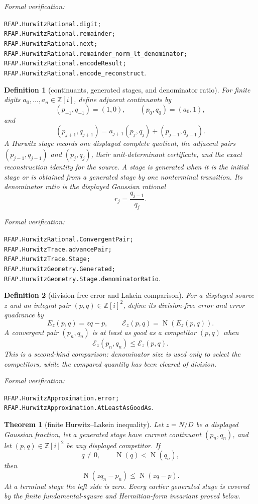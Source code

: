 \documentclass[11pt]{article}
\newtheorem{theorem}{Theorem}[section]
\newtheorem{definition}[definition]{Definition}
\newcommand{\Zi}{\mathbb{Z}[i]}
\newcommand{\Norm}[1]{\operatorname{N}\!\left(#1\right)}
\newcommand{\leanref}[1]{\par\smallskip\noindent
  \emph{Formal verification:}\par\nobreak
  {\raggedright\nolinkurl{#1}.\par}}
\begin{document}
\leanref{RFAP.HurwitzRational.digit;
RFAP.HurwitzRational.remainder;
RFAP.HurwitzRational.next;
RFAP.HurwitzRational.remainder_norm_lt_denominator;
RFAP.HurwitzRational.encodeResult;
RFAP.HurwitzRational.encode_reconstruct}

\begin{definition}[continuants, generated stages, and denominator ratio]
\label{def:hurwitz-stage}
For finite digits $a_0,\ldots,a_n\in\Zi$, define adjacent continuants by
\[
 (p_{-1},q_{-1})=(1,0),\qquad (p_0,q_0)=(a_0,1),
\]
and
\begin{equation}
\label{eq:continuant-recurrence}
 (p_{j+1},q_{j+1})=
 a_{j+1}(p_j,q_j)+(p_{j-1},q_{j-1}).
\end{equation}
A \emph{Hurwitz stage} records one displayed complete quotient, the adjacent
pairs $(p_{j-1},q_{j-1})$ and $(p_j,q_j)$, their unit-determinant
certificate, and the exact reconstruction identity for the source.  A stage
is \emph{generated} when it is the initial stage or is obtained from a
generated stage by one nonterminal transition.  Its \emph{denominator ratio}
is the displayed Gaussian rational
\begin{equation}
\label{eq:denominator-ratio}
                         r_j=\frac{q_{j-1}}{q_j}.
\end{equation}
\end{definition}

\leanref{RFAP.HurwitzRational.ConvergentPair;
RFAP.HurwitzTrace.advancePair;
RFAP.HurwitzTrace.Stage;
RFAP.HurwitzGeometry.Generated;
RFAP.HurwitzGeometry.Stage.denominatorRatio}

\begin{definition}[division-free error and Lakein comparison]
\label{def:lakein-comparison}
For a displayed source $z$ and an integral pair $(p,q)\in\Zi^2$, define its
division-free error and error quadrance by
\[
             E_z(p,q)=zq-p,
             \qquad \mathcal E_z(p,q)=\Norm{E_z(p,q)}.
\]
A convergent pair $(p_n,q_n)$ is \emph{at least as good as} a competitor
$(p,q)$ when
\[
                      \mathcal E_z(p_n,q_n)
                      \le\mathcal E_z(p,q).
\]
This is a second-kind comparison: denominator size is used only to select the
competitors, while the compared quantity has been cleared of division.
\end{definition}

\leanref{RFAP.HurwitzApproximation.error;
RFAP.HurwitzApproximation.AtLeastAsGoodAs}

\begin{theorem}[finite Hurwitz--Lakein inequality]
\label{thm:finite-lakein}
Let $z=N/D$ be a displayed Gaussian fraction, let a generated stage have
current continuant $(p_n,q_n)$, and let $(p,q)\in\Zi^2$ be any displayed
competitor.  If
\[
                         q\ne0,
              \qquad    \Norm q<\Norm{q_n},
\]
then
\begin{equation}
\label{eq:finite-lakein}
                        \Norm{zq_n-p_n}
                     \le\Norm{zq-p}.
\end{equation}
At a terminal stage the left side is zero.  Every earlier generated stage is
covered by the finite fundamental-square and Hermitian-form invariant proved
below.
\end{theorem}
\end{document}
